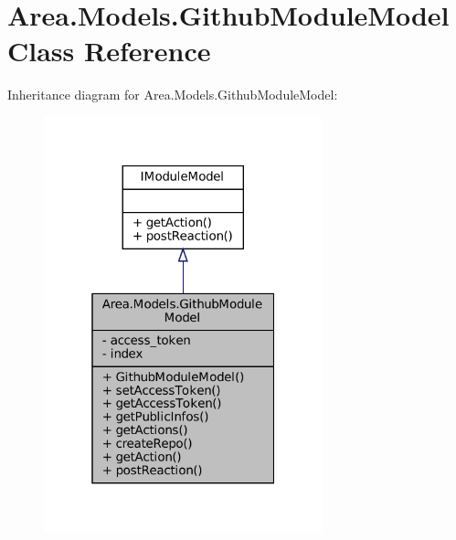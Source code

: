 \hypertarget{classArea_1_1Models_1_1GithubModuleModel}{}\section{Area.\+Models.\+Github\+Module\+Model Class Reference}
\label{classArea_1_1Models_1_1GithubModuleModel}


Inheritance diagram for Area.\+Models.\+Github\+Module\+Model\+:
\nopagebreak
\begin{figure}[H]
\begin{center}
\leavevmode
\includegraphics[width=229pt]{classArea_1_1Models_1_1GithubModuleModel__inherit__graph}
\end{center}
\end{figure}


